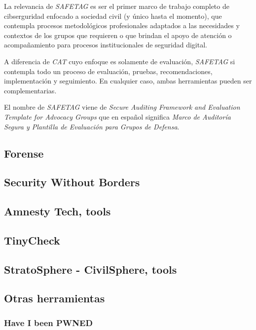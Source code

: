 \documentclass[12pt]{caltech_thesis}
\begin{document}
La relevancia de \textit{SAFETAG} es ser el primer marco de trabajo completo de cibserguridad enfocado a sociedad civil (y único hasta el momento), que contempla procesos metodológicos profesionales adaptados a las necesidades y contextos de los grupos que requieren o que brindan el apoyo de atención o acompañamiento para procesos institucionales de seguridad digital.

A diferencia de \textit{CAT} cuyo enfoque es solamente de evaluación, \textit{SAFETAG} si contempla todo un proceso de evaluación, pruebas, recomendaciones, implementación y seguimiento.  En cualquier caso, ambas herramientas pueden ser complementarias.

El nombre de \textit{SAFETAG} viene de \textit{Secure Auditing Framework and Evaluation Template for Advocacy Groups} que en español significa \textit{Marco de Auditoría Segura y Plantilla de Evaluación para Grupos de Defensa}. 

\subsection{Forense}

\subsection{Security Without Borders}

\lipsum[1]

\subsection{Amnesty Tech, tools}

\lipsum[1]

\subsection{TinyCheck}

\lipsum[1]

\subsection{StratoSphere - CivilSphere, tools}

\lipsum[1]

\subsection{Otras herramientas}

\subsubsection{Have I been PWNED}
\end{document}
